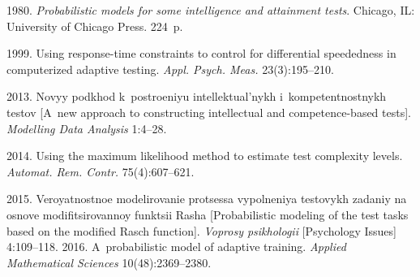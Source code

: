  \begin{multicols}{2}

\renewcommand{\bibname}{\protect\rmfamily References}

{\small\frenchspacing
 {%
 \begin{thebibliography}{99}

 1980. \textit{Probabilistic models for some intelligence and attainment tests}. 
Chicago, IL: University of Chicago Press. 224~p.

 1999. Using response-time 
constraints to control for differential speededness in computerized adaptive testing. \textit{Appl. 
Psych. Meas.} 23(3):195--210.

 2013. Novyy 
podkhod k~postroeniyu intellektual'nykh i~kompetentnostnykh testov 
[A~new approach to constructing intellectual and competence-based tests]. 
\textit{Modelling Data Analysis} 1:4--28.

 2014. Using the maximum likelihood method to 
estimate test complexity levels. \textit{Automat. Rem. Contr.} 75(4):607--621.

 2015. Veroyatnostnoe mo\-de\-li\-ro\-va\-nie protsessa vypolneniya testovykh 
zadaniy na osnove modifitsirovannoy funktsii Rasha [Probabilistic modeling of the test tasks 
based on the modified Rasch function]. \textit{Voprosy psikhologii} [Psychology Issues]  
4:109--118.
 2016. A~probabilistic model of adaptive training. 
\textit{Applied Mathematical Sciences}  10(48):2369--2380.


\end{thebibliography}}}
\end{multicols}
